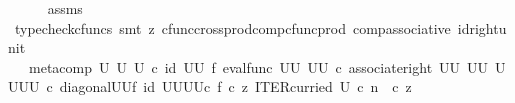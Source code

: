 \begin{isabellebody}
\ \ \ \ \isamarkupfalse%
\ assms\ \isamarkupfalse%
\ {\isacharparenleft}{\kern0pt}typecheck{\isacharunderscore}{\kern0pt}cfuncs{\isacharcomma}{\kern0pt}\ smt\ {\isacharparenleft}{\kern0pt}z{}{\isacharparenright}{\kern0pt}\ cfunc{\isacharunderscore}{\kern0pt}cross{\isacharunderscore}{\kern0pt}prod{\isacharunderscore}{\kern0pt}comp{\isacharunderscore}{\kern0pt}cfunc{\isacharunderscore}{\kern0pt}prod\ comp{\isacharunderscore}{\kern0pt}associative{}\ id{\isacharunderscore}{\kern0pt}right{\isacharunderscore}{\kern0pt}unit{}{\isacharparenright}{\kern0pt}\isanewline
\ \ \isamarkupfalse%
\ \isamarkupfalse%
\ {\isachardoublequoteopen}{\isachardot}{\kern0pt}{\isachardot}{\kern0pt}{\isachardot}{\kern0pt}\ {\isacharequal}{\kern0pt}\ {\isacharparenleft}{\kern0pt}meta{\isacharunderscore}{\kern0pt}comp\ U\ U\ U\ {\isasymcirc}\isactrlsub c\ {\isacharparenleft}{\kern0pt}id\ {\isacharparenleft}{\kern0pt}U\isactrlbsup U\isactrlesup {\isacharparenright}{\kern0pt}\ {\isasymtimes}\isactrlsub f\ eval{\isacharunderscore}{\kern0pt}func\ {\isacharparenleft}{\kern0pt}U\isactrlbsup U\isactrlesup {\isacharparenright}{\kern0pt}\ {\isacharparenleft}{\kern0pt}U\isactrlbsup U\isactrlesup {\isacharparenright}{\kern0pt}{\isacharparenright}{\kern0pt}\ {\isasymcirc}\isactrlsub c\ {\isacharparenleft}{\kern0pt}associate{\isacharunderscore}{\kern0pt}right\ {\isacharparenleft}{\kern0pt}U\isactrlbsup U\isactrlesup {\isacharparenright}{\kern0pt}\ {\isacharparenleft}{\kern0pt}U\isactrlbsup U\isactrlesup {\isacharparenright}{\kern0pt}\ {\isacharparenleft}{\kern0pt}{\isacharparenleft}{\kern0pt}U\isactrlbsup U\isactrlesup {\isacharparenright}{\kern0pt}\isactrlbsup U\isactrlbsup U\isactrlesup \isactrlesup {\isacharparenright}{\kern0pt}{\isacharparenright}{\kern0pt}\ {\isasymcirc}\isactrlsub c\ {\isacharparenleft}{\kern0pt}diagonal{\isacharparenleft}{\kern0pt}U\isactrlbsup U\isactrlesup {\isacharparenright}{\kern0pt}{\isasymtimes}\isactrlsub f\ id\ {\isacharparenleft}{\kern0pt}{\isacharparenleft}{\kern0pt}U\isactrlbsup U\isactrlesup {\isacharparenright}{\kern0pt}\isactrlbsup U\isactrlbsup U\isactrlesup \isactrlesup {\isacharparenright}{\kern0pt}{\isacharparenright}{\kern0pt}{\isacharparenright}{\kern0pt}{\isasymcirc}\isactrlsub c\ {\isasymlangle}f\ {\isasymcirc}\isactrlsub c\ z{\isacharcomma}{\kern0pt}\ ITER{\isacharunderscore}{\kern0pt}curried\ U\ {\isasymcirc}\isactrlsub c\ {\isacharparenleft}{\kern0pt}n\ \ {\isasymcirc}\isactrlsub c\ z{\isacharparenright}{\kern0pt}{\isasymrangle}{\isachardoublequoteclose}\isanewline

\end{isabellebody}
